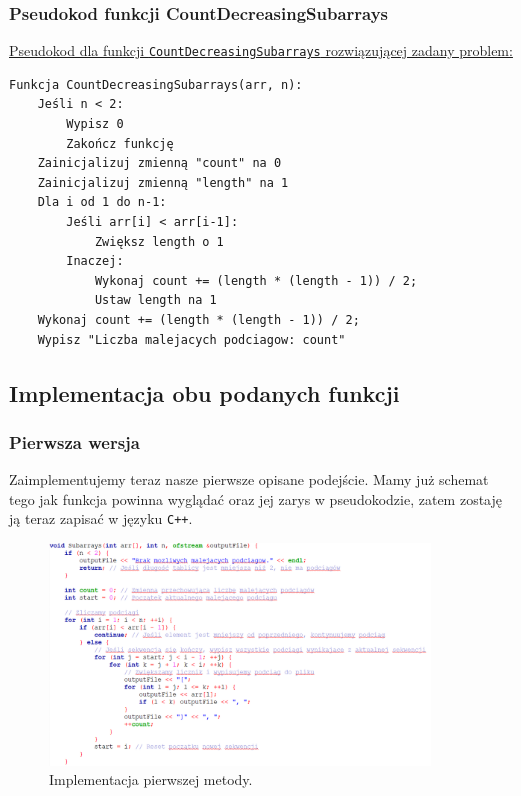 \documentclass[a4paper,12pt]{article}
\begin{document}
\newpage

\subsubsection{Pseudokod funkcji CountDecreasingSubarrays}

\underline{Pseudokod dla funkcji \texttt{CountDecreasingSubarrays} rozwiązującej zadany problem: } 
\begin{verbatim}
Funkcja CountDecreasingSubarrays(arr, n):
    Jeśli n < 2:
        Wypisz 0 
        Zakończ funkcję
    Zainicjalizuj zmienną "count" na 0
    Zainicjalizuj zmienną "length" na 1
    Dla i od 1 do n-1:
        Jeśli arr[i] < arr[i-1]:
            Zwiększ length o 1
        Inaczej:
            Wykonaj count += (length * (length - 1)) / 2;
            Ustaw length na 1
    Wykonaj count += (length * (length - 1)) / 2;
    Wypisz "Liczba malejacych podciagow: count"
\end{verbatim}

\newpage

\subsection{Implementacja obu podanych funkcji}

\subsubsection{Pierwsza wersja}

Zaimplementujemy teraz nasze pierwsze opisane podejście. Mamy już schemat tego jak funkcja powinna wyglądać oraz jej zarys w pseudokodzie, zatem zostaję ją teraz zapisać w języku \texttt{C++}.

\begin{figure}[H]
    \centering
    \includegraphics[width=0.9\textwidth]{Implement1.png}
    \caption{Implementacja pierwszej metody.}
    \label{fig:schemat_Implement1}
\end{figure}
\end{document}
